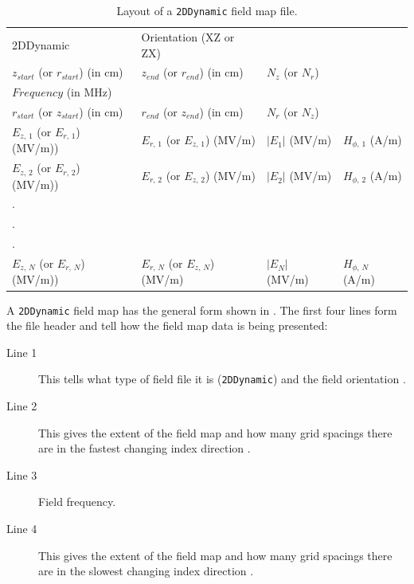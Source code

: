 \begin{table}[ht!]
    \caption{Layout of a \texttt{2DDynamic} field map file.}
    \label{tab:2DDynamic}
    \begin{center}
    \begin{tabular}{llll}
      \hline
      2DDynamic & Orientation (XZ or ZX) & & \\
      $z_{start}$ (or $r_{start}$) (in cm) & $z_{end}$ (or $r_{end}$) (in cm) & $N_{z}$ (or $N_{r}$)& \\
      $Frequency$ (in MHz) & & & \\
      $r_{start}$ (or $z_{start}$) (in cm) & $r_{end}$ (or $z_{end}$) (in cm) & $N_{r}$ (or $N_{z}$)& \\
      $E_{z,\,1}$ (or $E_{r,\,1}$) (MV/m)) & $E_{r,\,1}$ (or $E_{z,\,1}$) (MV/m) & $|E_1|$ (MV/m) & $H_{\phi,\,1}$ (A/m) \\
      $E_{z,\,2}$ (or $E_{r,\,2}$) (MV/m)) & $E_{r,\,2}$ (or $E_{z,\,2}$) (MV/m) & $|E_2|$ (MV/m) & $H_{\phi,\,2}$ (A/m) \\
      . & & \\
      . & & \\
      . & & \\
      $E_{z,\,N}$ (or $E_{r,\,N}$) (MV/m)) & $E_{r,\,N}$ (or $E_{z,\,N}$) (MV/m) & $|E_N|$ (MV/m) & $H_{\phi,\,N}$ (A/m) \\
      \hline
    \end{tabular}
    \end{center}
\end{table}

A \texttt{2DDynamic} field map has the general form shown in . The first four lines form
the file header and tell \opalt how the field map data is being presented:

\begin{description}
\item[Line 1] This tells \opalt what type of field file it is (\texttt{2DDynamic}) and the field orientation
  .
\item[Line 2] This gives the extent of the field map and how many grid spacings there are in the fastest changing
  index direction .
\item[Line 3] Field frequency.
\item[Line 4] This gives the extent of the field map and how many grid spacings there are in the slowest changing
  index direction .
\end{description}

